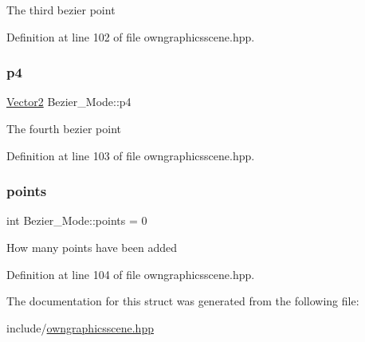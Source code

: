 The third bezier point 

Definition at line 102 of file owngraphicsscene.\+hpp.

\mbox{\label{structBezier__Mode_a5a3df46137ba62eaf3f9c0ad1ee391ef}} 
\subsubsection{\texorpdfstring{p4}{p4}}
{\footnotesize\ttfamily \mbox{\hyperlink{classVector2}{Vector2}} Bezier\+\_\+\+Mode\+::p4}

The fourth bezier point 

Definition at line 103 of file owngraphicsscene.\+hpp.

\mbox{\label{structBezier__Mode_a5389426ea819f66e663684f6244c3960}} 
\subsubsection{\texorpdfstring{points}{points}}
{\footnotesize\ttfamily int Bezier\+\_\+\+Mode\+::points = 0}

How many points have been added 

Definition at line 104 of file owngraphicsscene.\+hpp.



The documentation for this struct was generated from the following file\+:\begin{DoxyCompactItemize}
\item 
include/\mbox{\hyperlink{owngraphicsscene_8hpp}{owngraphicsscene.\+hpp}}\end{DoxyCompactItemize}
